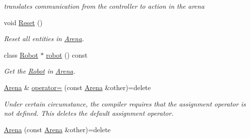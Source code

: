 \begin{DoxyCompactItemize}
\begin{DoxyCompactList}\small\item\em translates communication from the controller to action in the arena \end{DoxyCompactList}\item 
void \hyperlink{classArena_a95e295d03a14385f4402a8e839fbae9b}{Reset} ()\hypertarget{classArena_a95e295d03a14385f4402a8e839fbae9b}{}\label{classArena_a95e295d03a14385f4402a8e839fbae9b}

\begin{DoxyCompactList}\small\item\em Reset all entities in \hyperlink{classArena}{Arena}. \end{DoxyCompactList}\item 
class \hyperlink{classRobot}{Robot} $\ast$ \hyperlink{classArena_af9b489317866a4541c6531acb63602c3}{robot} () const 
\begin{DoxyCompactList}\small\item\em Get the \hyperlink{classRobot}{Robot} in \hyperlink{classArena}{Arena}. \end{DoxyCompactList}\item 
\hyperlink{classArena}{Arena} \& \hyperlink{classArena_aa977a50aa4a5570a2a553705f1909e9b}{operator=} (const \hyperlink{classArena}{Arena} \&other)=delete\hypertarget{classArena_aa977a50aa4a5570a2a553705f1909e9b}{}\label{classArena_aa977a50aa4a5570a2a553705f1909e9b}

\begin{DoxyCompactList}\small\item\em Under certain circumstance, the compiler requires that the assignment operator is not defined. This {\ttfamily deletes} the default assignment operator. \end{DoxyCompactList}\item 
\hyperlink{classArena_afce6e35e1470823539dc9194bef77499}{Arena} (const \hyperlink{classArena}{Arena} \&other)=delete\hypertarget{classArena_afce6e35e1470823539dc9194bef77499}{}\label{classArena_afce6e35e1470823539dc9194bef77499}


\end{DoxyCompactItemize}
